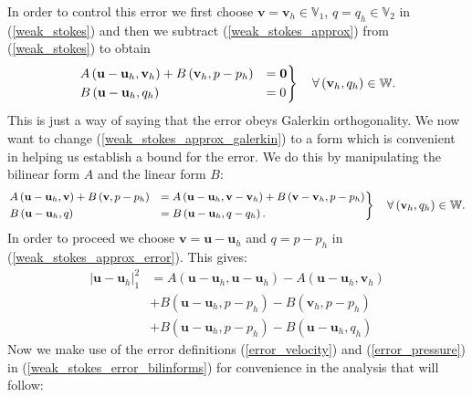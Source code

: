 \documentclass[12pt,a4paper]{article}
\theoremstyle{definition}
\begin{document}
In order to control this error we first choose $\textbf{v}=\textbf{v}_h\in\mathbb{V}_1$, $q=q_h\in\mathbb{V}_2$ in (\ref{weak_stokes}) and then we subtract (\ref{weak_stokes_approx}) from (\ref{weak_stokes}) to obtain
\begin{equation}\label{weak_stokes_approx_galerkin}
	\begin{rcases}
	A\left(\textbf{u}-\textbf{u}_h,\textbf{v}_h\right)+B\left(\textbf{v}_h,p-p_h\right)&=\textbf{0}\\
	B\left(\textbf{u}-\textbf{u}_h,q_h\right)&=0
	\end{rcases}\quad\forall \left(\textbf{v}_h,q_h\right)\in \mathbb{W}.
\end{equation}
This is just a way of saying that the error obeys Galerkin orthogonality.  We now want to change (\ref{weak_stokes_approx_galerkin}) to a form which is convenient in helping us establish a bound for the error.  We do this by manipulating the bilinear form $A$ and the linear form $B$:
\begin{equation}\small \label{weak_stokes_approx_error}
\begin{rcases}
A\left(\textbf{u}-\textbf{u}_h,\textbf{v}\right)+B\left(\textbf{v},p-p_h\right)&=A\left(\textbf{u}-\textbf{u}_h,\textbf{v}-\textbf{v}_h\right)+B\left(\textbf{v}-\textbf{v}_h,p-p_h\right)\\
B\left(\textbf{u}-\textbf{u}_h,q\right)&=B\left(\textbf{u}-\textbf{u}_h,q-q_h\right).
\end{rcases}\quad\forall \left(\textbf{v}_h,q_h\right)\in \mathbb{W}.
\end{equation}
In order to proceed we choose $\textbf{v}=\textbf{u}-\textbf{u}_h$ and $q=p-p_h$ in (\ref{weak_stokes_approx_error}).  This gives:
\begin{equation} \label{weak_stokes_error_bilinforms}
\begin{aligned}
\left|\textbf{u}-\textbf{u}_h\right|^2_1 &=A\left(\textbf{u}-\textbf{u}_h,\textbf{u}-\textbf{u}_h\right)-A\left(\textbf{u}-\textbf{u}_h,\textbf{v}_h\right)\\
														  &+B\left(\textbf{u}-\textbf{u}_h,p-p_h\right)-B\left(\textbf{v}_h,p-p_h\right)\\
														  &+B\left(\textbf{u}-\textbf{u}_h,p-p_h\right)-B\left(\textbf{u}-\textbf{u}_h,q_h\right)
\end{aligned}
\end{equation}
Now we make use of the error definitions (\ref{error_velocity}) and (\ref{error_pressure}) in (\ref{weak_stokes_error_bilinforms}) for convenience in the analysis that will follow:
\end{document}
